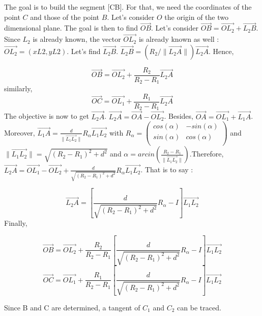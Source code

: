 \documentclass[a4paper,12pt,fleqn]{article}
\begin{document}
The goal is to build the segment [CB]. For that, we need the coordinates of the point \mbox{$C$} and those of the point \mbox{$B$}. Let's consider \mbox{$O$} the origin of the two dimensional plane. The goal is then to find \mbox{$\overrightarrow{OB}$}. Let's consider \mbox{$\overrightarrow{OB} = \overrightarrow{OL_2} + \overrightarrow{L_2B}$}. Since \mbox{$L_2$} is already known, the vector \mbox{$\overrightarrow{OL_2}$} is already known as well : \mbox{$\overrightarrow{OL_2} = (xL2, yL2)$}. Let's find \mbox{$\overrightarrow{L_2B}$}. \mbox{$\overrightarrow{L_2B} = (R_2 / \lVert \overrightarrow{L_2A} \rVert) \overrightarrow{L_2A}$}. Hence, 

\[ \overrightarrow{OB} = \overrightarrow{OL_2} + \frac{R_2}{R_2 - R_1}\overrightarrow{L_2A}\]
similarly,
\[ \overrightarrow{OC} = \overrightarrow{OL_1} + \frac{R_1}{R_2 - R_1}\overrightarrow{L_2A}\]
The objective is now to get \mbox{$\overrightarrow{L_2A}$}. \mbox{$\overrightarrow{L_2A} = \overrightarrow{OA} - \overrightarrow{OL_2}$}. Besides, \mbox{$\overrightarrow{OA} = \overrightarrow{OL_1} + \overrightarrow{L_1A}$}. Moreover, \mbox{$\overrightarrow{L_1A} = \frac{d}{\lVert \overrightarrow{L_1L_2} \rVert}R_\alpha \overrightarrow{L_1L_2}$} with \mbox{$R_\alpha = \begin{pmatrix} 
cos(\alpha) &  -sin(\alpha)\\ 
sin(\alpha) & cos(\alpha) \\ 
\end{pmatrix}$} and \mbox{$\lVert \overrightarrow{L_1L_2} \rVert = \sqrt{(R_2 - R_1)^2 + d^2}$} and \mbox{$\alpha = arcin(\frac{R_2 - R_1}{\lVert \overrightarrow{L_1L_2} \rVert})$}.Therefore, \mbox{$\overrightarrow{L_2A} = \overrightarrow{OL_1} - \overrightarrow{OL_2} + \frac{d}{\sqrt{(R_2 - R_1)^2 + d^2}}R_\alpha \overrightarrow{L_1L_2}$}. That is to say : 

\[ \overrightarrow{L_2A} = [\frac{d}{\sqrt{(R_2 - R_1)^2 + d^2}}R_\alpha - I] \overrightarrow{L_1L_2} \]
Finally,


\[\overrightarrow{OB} =  \overrightarrow{OL_2} + \frac{R_2}{R_2 - R_1}[\frac{d}{\sqrt{(R_2 - R_1)^2 + d^2}}R_\alpha - I] \overrightarrow{L_1L_2}\]
\[\overrightarrow{OC} =  \overrightarrow{OL_1} + \frac{R_1}{R_2 - R_1}[\frac{d}{\sqrt{(R_2 - R_1)^2 + d^2}}R_\alpha - I] \overrightarrow{L_1L_2}\]

Since B and C are determined, a tangent of \mbox{$C_1$} and \mbox{$C_2$} can be traced.
\end{document}
